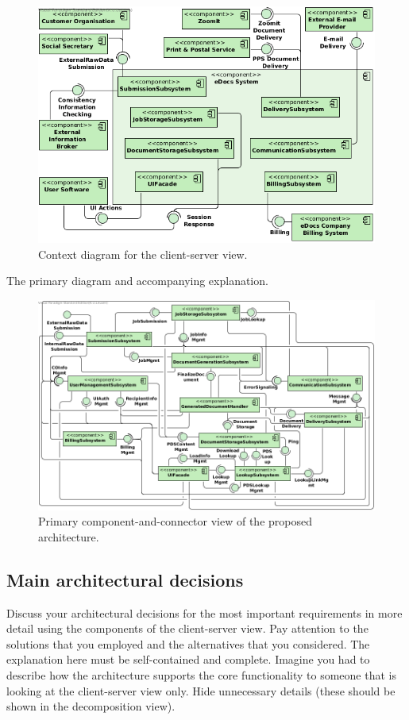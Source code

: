 \begin{figure}[!htp]
    \centering
    \includegraphics[width=\textwidth]{figures/Context Diagram 1.png}
    \caption{Context diagram for the client-server view.}\label{fig:cc-context}
\end{figure}

The primary diagram and accompanying explanation.

\begin{figure}[!htp]
    \centering
    \includegraphics[width=\textwidth]{figures/Subsystem Diagram.png}
    \caption{Primary component-and-connector view of the proposed architecture.}\label{fig:cs-primary}
\end{figure}

\subsection{Main architectural decisions}
Discuss your architectural decisions for the most important requirements in
more detail using the components of the client-server view.
Pay attention to the solutions that you employed and the alternatives that you
considered.
The explanation here must be self-contained and complete.
Imagine you had to describe how the architecture supports the core
functionality to someone that is looking at the client-server view only.
Hide unnecessary details (these should be shown in the decomposition view).

